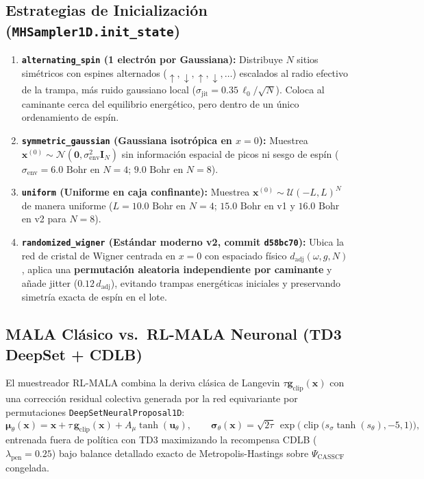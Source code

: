 \documentclass[10pt,a4paper]{article}
\begin{document}
\subsection{Estrategias de Inicializaci\'on (\texttt{MHSampler1D.init\_state})}
\begin{enumerate}
\item \textbf{\texttt{alternating\_spin} (1 electr\'on por Gaussiana):} Distribuye $N$ sitios sim\'etricos con espines alternados ($\uparrow, \downarrow, \uparrow, \downarrow, \dots$) escalados al radio efectivo de la trampa, m\'as ruido gaussiano local ($\sigma_{\mathrm{jit}} = 0.35\,\ell_0/\sqrt{N}$). Coloca al caminante cerca del equilibrio energ\'etico, pero dentro de un \'unico ordenamiento de esp\'in.
\item \textbf{\texttt{symmetric\_gaussian} (Gaussiana isotr\'opica en $x=0$):} Muestrea $\mathbf{x}^{(0)} \sim \mathcal{N}(\mathbf{0}, \sigma_{\mathrm{env}}^2 \mathbf{I}_N)$ sin informaci\'on espacial de picos ni sesgo de esp\'in ($\sigma_{\mathrm{env}} = 6.0\text{ Bohr}$ en $N=4$; $9.0\text{ Bohr}$ en $N=8$).
\item \textbf{\texttt{uniform} (Uniforme en caja confinante):} Muestrea $\mathbf{x}^{(0)} \sim \mathcal{U}(-L, L)^N$ de manera uniforme ($L = 10.0\text{ Bohr}$ en $N=4$; $15.0\text{ Bohr}$ en v1 y $16.0\text{ Bohr}$ en v2 para $N=8$).
\item \textbf{\texttt{randomized\_wigner} (Est\'andar moderno v2, commit \texttt{d58bc70}):} Ubica la red de cristal de Wigner centrada en $x=0$ con espaciado f\'isico $d_{\mathrm{adj}}(\omega, g, N)$, aplica una \textbf{permutaci\'on aleatoria independiente por caminante} y a\~nade jitter ($0.12\,d_{\mathrm{adj}}$), evitando trampas energ\'eticas iniciales y preservando simetr\'ia exacta de esp\'in en el lote.
\end{enumerate}

\subsection{MALA Cl\'asico vs.\ RL-MALA Neuronal (TD3 DeepSet + CDLB)}
El muestreador RL-MALA combina la deriva cl\'asica de Langevin $\tau \mathbf{g}_{\mathrm{clip}}(\mathbf{x})$ con una correcci\'on residual colectiva generada por la red equivariante por permutaciones \texttt{DeepSetNeuralProposal1D}:
\begin{equation}
\boldsymbol{\mu}_\theta(\mathbf{x}) = \mathbf{x} + \tau\,\mathbf{g}_{\mathrm{clip}}(\mathbf{x}) + A_\mu \tanh(\mathbf{u}_\theta), \qquad
\boldsymbol{\sigma}_\theta(\mathbf{x}) = \sqrt{2\tau}\,\exp\!\Big(\operatorname{clip}\big(s_\sigma \tanh(s_\theta), -5, 1\big)\Big),
\end{equation}
entrenada fuera de pol\'itica con TD3 maximizando la recompensa CDLB ($\lambda_{\mathrm{pen}}=0.25$) bajo balance detallado exacto de Metropolis-Hastings sobre $\Psi_{\mathrm{CASSCF}}$ congelada.
\end{document}
